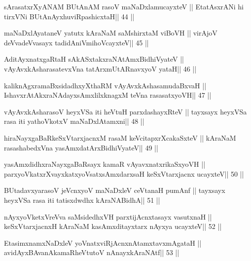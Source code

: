 \begin{shl}
sArasatxrXyANAM BUtAnAM rasoV maNaDxlamucayxteV ||
EtatAsxrANi hi tirxVNi BUtAnAyxhuviRpashicxtaH\hfill || 44 ||
\end{shl}

\begin{shl}
maNaDxlAyataneV yatutx kAraNaM saMshirxtaM viBoVH ||
virAjoV deVvadeVvasayx tadidAniVmihoVcayxteV\hfill || 45 ||
\end{shl}

\begin{shl}
AditAyxnatxgaRtaH sAkASxtakxraNAtAmx\s BidhiVyateV ||
vAyAvxkAsharasatevxVna tatArxmUtARnavxyoV yataH\hfill || 46 ||
\end{shl}

\begin{shl}
kaliknAgxramaBxsidadhxyXthaRM vAyAvxkAshasamudaBxvaH ||
IshavxrAtAkxraNAdayxsAmxlilxknagxM teVna rasasatxyoVH\hfill || 47 ||
\end{shl}

\begin{shl}
vAyAvxkAsharasoV heyxVSa iti heVtuH parxdashayxRteV ||
tayxsayx heyxVSa rasa iti yathoVkotxV maNaDxlAtamxni\hfill || 48 ||
\end{shl}

\begin{shl}
hiraNayxgaBaRkeSxVtarxjacnxM rasaM keVcitapxrXcakaSxteV ||
kAraNaM rasashabedxVna yasAmxdatArxBidhiVyateV\hfill || 49 ||
\end{shl}

\begin{shl}
yasAmxdidhxraNayxgaBaRsayx kamaR vAyavxnatxrikaSxyoVH ||
parxyoVkatxrXvayxkatxyoVsatxsAmxdarxsaH keSxVtarxjacnx ucayxteV\hfill || 50 ||
\end{shl}

\begin{shl}
BUtadavxyarasoV jeVcnxyoV maNaDxleV ceVtanaH pumAnf ||
tayxsayx heyxVSa rasa iti tatisxdwdhx kAraNABidhA\hfill || 51 ||
\end{shl}

\begin{shl}
nAyxyoVketxVreVva saMsidedhxVH parxtijAcnxtasayx vasutxnaH ||
keSxVtarxjacnxH kAraNaM kasAmxditayxtarx nAyxya ucayxteV\hfill || 52 ||
\end{shl}

\begin{shl}
EtasimxnamxNaDxleV yoV\s natxviRjAcnxnAtamxtavxmAgataH ||
avidAyxBAvanAkamaRheVtutoV nAnayxkAraNAtf\hfill || 53 ||
\end{shl}

